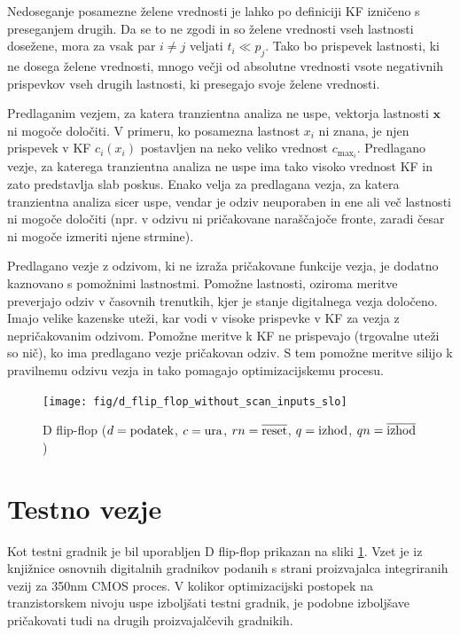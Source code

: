 \documentclass[journal,a4paper,twoside]{sty/IEEEtran}
\begin{document}
Nedoseganje posamezne želene vrednosti je lahko po definiciji KF izničeno s preseganjem drugih. Da se to ne zgodi in so želene vrednosti vseh lastnosti dosežene, mora za vsak par $i \ne j$ veljati $t_i \ll p_j$. Tako bo prispevek lastnosti, ki ne dosega želene vrednosti, mnogo večji od absolutne vrednosti vsote negativnih prispevkov vseh drugih lastnosti, ki presegajo svoje želene vrednosti.

Predlaganim vezjem, za katera tranzientna analiza ne uspe, vektorja lastnosti $\mathbf{x}$ ni mogoče določiti. V primeru, ko posamezna lastnost $x_i$ ni znana, je njen prispevek v KF $c_i(x_i)$ postavljen na neko veliko vrednost $c_{\mathrm{max}_i}$. Predlagano vezje, za katerega tranzientna analiza ne uspe ima tako visoko vrednost KF in zato predstavlja slab poskus. Enako velja za predlagana vezja, za katera tranzientna analiza sicer uspe, vendar je odziv neuporaben in ene ali več lastnosti ni mogoče določiti (npr. v odzivu ni pričakovane naraščajoče fronte, zaradi česar ni mogoče izmeriti njene strmine). 

Predlagano vezje z odzivom, ki ne izraža pričakovane funkcije vezja, je dodatno kaznovano s pomožnimi lastnostmi. Pomožne lastnosti, oziroma meritve preverjajo odziv v časovnih trenutkih, kjer je stanje digitalnega vezja določeno. Imajo velike kazenske uteži, kar vodi v visoke prispevke v KF za vezja z nepričakovanim odzivom. Pomožne meritve k KF ne prispevajo (trgovalne uteži so nič), ko ima predlagano vezje pričakovan odziv. S tem pomožne meritve silijo k pravilnemu odzivu vezja in tako pomagajo optimizacijskemu procesu.

\begin{figure}[t]
\begin{center}
\begin{minipage}[t]{12cm}
\texttt{[image: fig/d\_flip\_flop\_without\_scan\_inputs\_slo]}
\caption{D flip-flop ($d = {\rm podatek}$, $c = {\rm ura}$, $rn = {\overline {\rm reset}}$, $q = {\rm izhod}$, $qn = {\overline {\rm izhod}}$)}
\end{minipage}
\end{center}
\label{d_flip_flop_without_scan_inputs}
\end{figure}

\section{Testno vezje}
Kot testni gradnik je bil uporabljen D flip-flop prikazan na sliki \ref{d_flip_flop_without_scan_inputs}. Vzet je iz knjižnice osnovnih digitalnih gradnikov podanih s strani proizvajalca integriranih vezij za 350nm CMOS proces. V kolikor optimizacijski postopek na tranzistorskem nivoju uspe izboljšati testni gradnik, je podobne izboljšave pričakovati tudi na drugih proizvajalčevih gradnikih.
\end{document}
